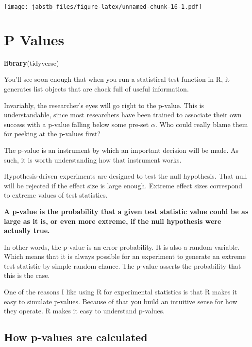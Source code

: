 \documentclass[]{book}
\newenvironment{Shaded}{\begin{snugshade}}{\end{snugshade}}
\newcommand{\KeywordTok}[1]{\textcolor[rgb]{0.13,0.29,0.53}{\textbf{#1}}}
\newcommand{\NormalTok}[1]{#1}
\begin{document}
\texttt{[image: jabstb\_files/figure-latex/unnamed-chunk-16-1.pdf]}

\hypertarget{pvalues}{%
\chapter{P Values}\label{pvalues}}

\begin{Shaded}
\begin{Highlighting}[]
\KeywordTok{library}\NormalTok{(tidyverse)}
\end{Highlighting}
\end{Shaded}

You'll see soon enough that when you run a statistical test function in R, it generates list objects that are chock full of useful information.

Invariably, the researcher's eyes will go right to the p-value. This is understandable, since most researchers have been trained to associate their own success with a p-value falling below some pre-set \(\alpha\). Who could really blame them for peeking at the p-values first?

The p-value is an instrument by which an important decision will be made. As such, it is worth understanding how that instrument works.

Hypothesis-driven experiments are designed to test the null hypothesis. That null will be rejected if the effect size is large enough. Extreme effect sizes correspond to extreme values of test statistics.

\textbf{A p-value is the probability that a given test statistic value could be as large as it is, or even more extreme, if the null hypothesis were actually true.}

In other words, the p-value is an error probability. It is also a random variable. Which means that it is always possible for an experiment to generate an extreme test statistic by simple random chance. The p-value asserts the probability that this is the case.

One of the reasons I like using R for experimental statistics is that R makes it easy to simulate p-values. Because of that you build an intuitive sense for how they operate. R makes it easy to understand p-values.

\hypertarget{how-p-values-are-calculated}{%
\section{How p-values are calculated}\label{how-p-values-are-calculated}}
\end{document}
